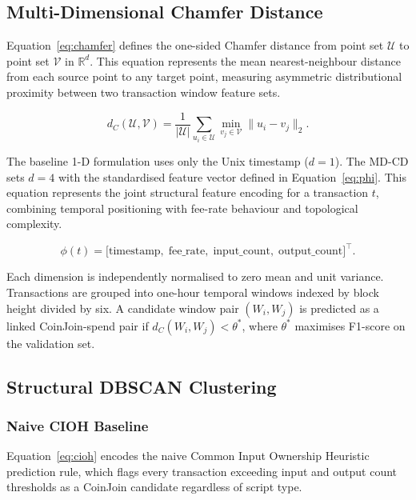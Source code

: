 \documentclass[12pt,a4paper]{article}
\begin{document}
\subsection{Multi-Dimensional Chamfer Distance}
\label{sec:mdcd}

Equation~\eqref{eq:chamfer} defines the one-sided Chamfer
distance from point set $\mathcal{U}$ to point set
$\mathcal{V}$ in $\mathbb{R}^d$. This equation represents
the mean nearest-neighbour distance from each source point
to any target point, measuring asymmetric distributional
proximity between two transaction window feature sets.

\begin{equation}
  d_C(\mathcal{U},\mathcal{V})
    = \frac{1}{|\mathcal{U}|}
      \sum_{u_i \in \mathcal{U}}
      \min_{v_j \in \mathcal{V}} \|u_i - v_j\|_2.
  \label{eq:chamfer}
\end{equation}

The baseline 1-D formulation uses only the Unix timestamp
($d=1$). The MD-CD sets $d=4$ with the standardised feature
vector defined in Equation~\eqref{eq:phi}. This equation
represents the joint structural feature encoding for a
transaction $t$, combining temporal positioning with
fee-rate behaviour and topological complexity.

\begin{equation}
  \phi(t) = \bigl[
    \text{timestamp},\;
    \text{fee\_rate},\;
    \text{input\_count},\;
    \text{output\_count}
  \bigr]^\top.
  \label{eq:phi}
\end{equation}

Each dimension is independently normalised to zero mean
and unit variance. Transactions are grouped into one-hour
temporal windows indexed by block height divided by six.
A candidate window pair $(W_i, W_j)$ is predicted as a
linked CoinJoin-spend pair if $d_C(W_i, W_j) < \theta^*$,
where $\theta^*$ maximises F1-score on the validation set.

\subsection{Structural DBSCAN Clustering}
\label{sec:taproot_method}

\subsubsection{Naive CIOH Baseline}

Equation~\eqref{eq:cioh} encodes the naive Common Input
Ownership Heuristic prediction rule, which flags every
transaction exceeding input and output count thresholds
as a CoinJoin candidate regardless of script type.
\end{document}

